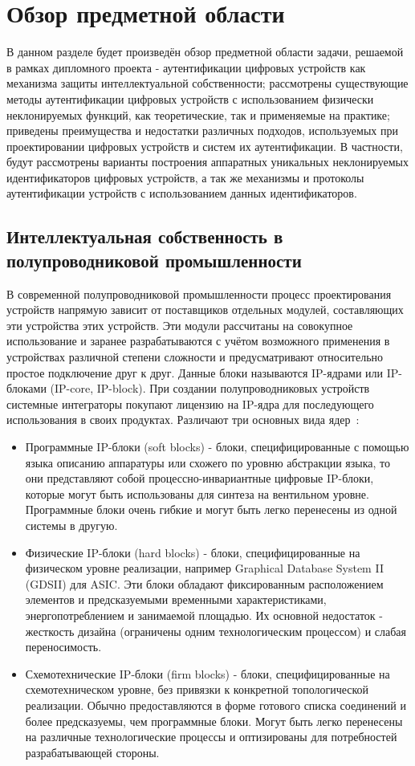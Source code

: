 \section{Обзор предметной области}
\label{sec:domain:intro}

В данном разделе будет произведён обзор предметной области задачи, решаемой в рамках дипломного проекта - аутентификации цифровых устройств как механизма защиты интеллектуальной собственности; рассмотрены существующие методы аутентификации цифровых устройств с использованием физически неклонируемых функций, как теоретические, так и применяемые на практике; приведены преимущества и недостатки различных подходов, используемых при проектировании цифровых устройств и систем их аутентификации.
В частности, будут рассмотрены варианты построения аппаратных уникальных неклонируемых идентификаторов цифровых устройств, а так же механизмы и протоколы аутентификации устройств с использованием данных идентификаторов.


\subsection{Интеллектуальная собственность в полупроводниковой промышленности}
\label{sub:domain:ic_ip}
В современной полупроводниковой промышленности процесс проектирования устройств напрямую зависит от поставщиков отдельных модулей, составляющих эти устройства этих устройств. Эти модули рассчитаны на совокупное использование и заранее разрабатываются с учётом возможного применения в устройствах различной степени сложности и предусматривают относительно простое подключение друг к друг.  Данные блоки называются IP-ядрами или IP-блоками (IP-core, IP-block). При создании полупроводниковых устройств системные интеграторы покупают лицензию на IP-ядра для последующего использования в своих продуктах. Различают три основных вида ядер~\cite{counterfeit_ics}:
\begin{itemize}
\item Программные IP-блоки (soft blocks) - блоки, специфицированные  с помощью языка описанию аппаратуры или схожего по уровню абстракции языка, то они представляют собой процессно-инвариантные цифровые IP-блоки, которые могут быть использованы для синтеза на вентильном уровне. Программные блоки очень гибкие и могут быть легко перенесены из одной системы в другую.
\item Физические IP-блоки (hard blocks) - блоки, специфицированные на физическом уровне реализации, например Graphical Database System II (GDSII) для ASIC. Эти блоки обладают фиксированным расположением элементов и предсказуемыми временными характеристиками, энергопотреблением и занимаемой площадью. Их основной недостаток - жесткость дизайна (ограничены одним технологическим процессом) и слабая переносимость.
\item Схемотехнические IP-блоки (firm blocks) - блоки, специфицированные на схемотехническом уровне, без привязки к конкретной топологической реализации. Обычно предоставляются в форме готового списка соединений и более предсказуемы, чем программные блоки. Могут быть легко перенесены на различные технологические процессы и оптизированы для потребностей разрабатывающей стороны.
\end{itemize}

